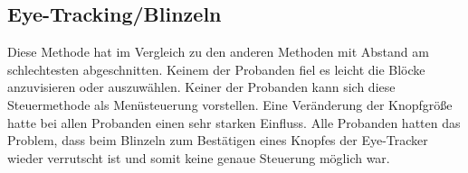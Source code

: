 \subsection{Eye-Tracking/Blinzeln}
Diese Methode hat im Vergleich zu den anderen Methoden mit Abstand am schlechtesten abgeschnitten. Keinem der Probanden fiel es leicht die Blöcke anzuvisieren oder auszuwählen. Keiner der Probanden kann sich diese Steuermethode als Menüsteuerung vorstellen. Eine Veränderung der Knopfgröße hatte bei allen Probanden einen sehr starken Einfluss. Alle Probanden hatten das Problem, dass beim Blinzeln zum Bestätigen eines Knopfes der Eye-Tracker wieder verrutscht ist und somit keine genaue Steuerung möglich war.

